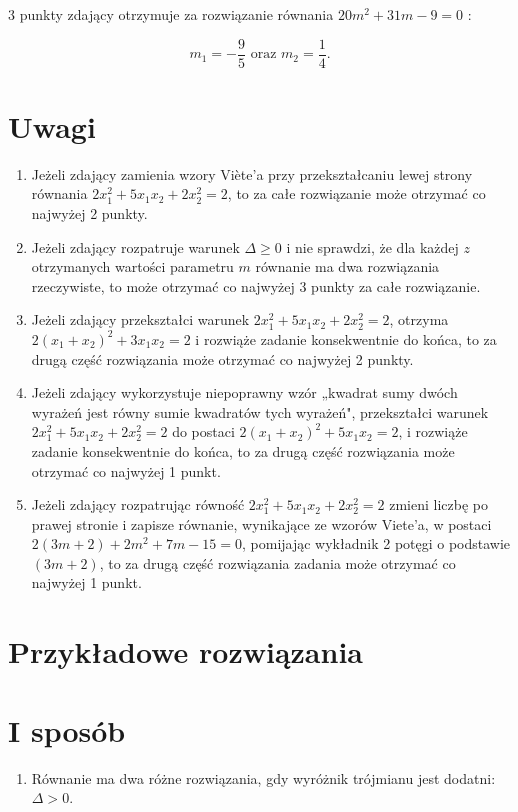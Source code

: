 \documentclass[10pt]{article}
\begin{document}
3 punkty zdający otrzymuje za rozwiązanie równania $20 m^{2}+31 m-9=0$ :

$$
m_{1}=-\frac{9}{5} \text { oraz } m_{2}=\frac{1}{4} .
$$

\section*{Uwagi}
\begin{enumerate}
  \item Jeżeli zdający zamienia wzory Viète'a przy przekształcaniu lewej strony równania $2 x_{1}^{2}+5 x_{1} x_{2}+2 x_{2}^{2}=2$, to za całe rozwiązanie może otrzymać co najwyżej 2 punkty.
  \item Jeżeli zdający rozpatruje warunek $\Delta \geq 0$ i nie sprawdzi, że dla każdej $z$ otrzymanych wartości parametru $m$ równanie ma dwa rozwiązania rzeczywiste, to może otrzymać co najwyżej 3 punkty za całe rozwiązanie.
  \item Jeżeli zdający przekształci warunek $2 x_{1}^{2}+5 x_{1} x_{2}+2 x_{2}^{2}=2$, otrzyma $2\left(x_{1}+x_{2}\right)^{2}+3 x_{1} x_{2}=2$ i rozwiąże zadanie konsekwentnie do końca, to za drugą część rozwiązania może otrzymać co najwyżej 2 punkty.
  \item Jeżeli zdający wykorzystuje niepoprawny wzór „kwadrat sumy dwóch wyrażeń jest równy sumie kwadratów tych wyrażeń", przekształci warunek $2 x_{1}^{2}+5 x_{1} x_{2}+2 x_{2}^{2}=2$ do postaci $2\left(x_{1}+x_{2}\right)^{2}+5 x_{1} x_{2}=2$, i rozwiąże zadanie konsekwentnie do końca, to za drugą część rozwiązania może otrzymać co najwyżej 1 punkt.
  \item Jeżeli zdający rozpatrując równość $2 x_{1}^{2}+5 x_{1} x_{2}+2 x_{2}^{2}=2$ zmieni liczbę po prawej stronie i zapisze równanie, wynikające ze wzorów Viete'a, w postaci $2(3 m+2)+2 m^{2}+7 m-15=0$, pomijając wykładnik 2 potęgi o podstawie $(3 m+2)$, to za drugą część rozwiązania zadania może otrzymać co najwyżej 1 punkt.
\end{enumerate}

\section*{Przykładowe rozwiązania}
\section*{I sposób}
\begin{enumerate}
  \item Równanie ma dwa różne rozwiązania, gdy wyróżnik trójmianu jest dodatni: $\Delta>0$.
\end{enumerate}
\end{document}
